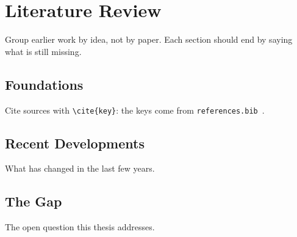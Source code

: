 \chapter{Literature Review}
\label{ch:literature}

Group earlier work by idea, not by paper. Each section should end by saying
what is still missing.

\section{Foundations}
Cite sources with \verb|\cite{key}|: the keys come from
\texttt{references.bib}~\cite{lamport1994,einstein1905}.

\section{Recent Developments}
What has changed in the last few years.

\section{The Gap}
The open question this thesis addresses.
